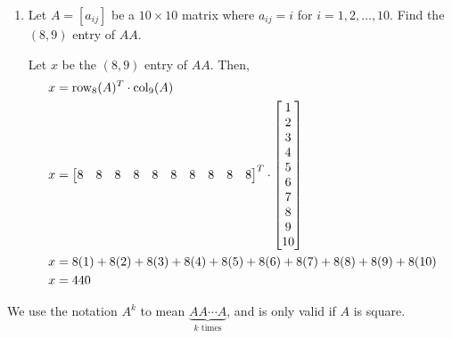 \begin{example}
\begin{enumerate}
            \item Let \(A = [a_{ij}]\) be a \(10 \times 10\) matrix where \(a_{ij} =  i\) for \(i = 1, 2, \ldots, 10\). Find the \((8, 9)\) entry of \(AA\).

            Let \(x\) be the \((8, 9)\) entry of \(AA\). Then,
            \begin{align*}
                x &= \operatorname{row}_8(A)^T \cdot \operatorname{col}_9(A) \\
                x &= \begin{bmatrix}
                    8 & 8 & 8 & 8 & 8 & 8 & 8 & 8 & 8 & 8
                \end{bmatrix}^T \cdot \begin{bmatrix}
                    1 \\ 2 \\ 3 \\ 4 \\ 5 \\ 6 \\ 7 \\ 8 \\ 9 \\ 10
                \end{bmatrix} \\
                x &= 8(1) + 8(2) + 8(3) + 8(4) + 8(5) + 8(6) + 8(7) + 8(8) + 8(9) + 8(10) \\
                x &= 440
            \end{align*}
        \end{enumerate}
    \end{example}

    \begin{note}
        We use the notation \(A^k\) to mean \(\underbrace{AA\cdots A}_{k \text{ times}}\), and is only valid if \(A\) is square.
    \end{note}